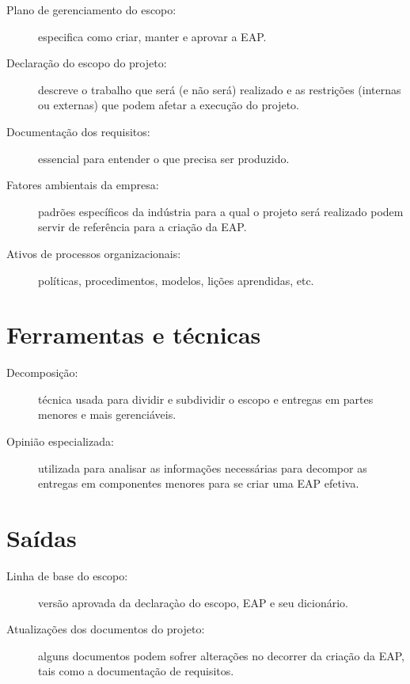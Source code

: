\begin{description}
	
	\item[Plano de gerenciamento do escopo:] especifica como criar, manter e aprovar a EAP.
	
	\item[Declaração do escopo do projeto:] descreve o trabalho que será (e não será) realizado e as restrições (internas ou externas) que podem afetar a execução do projeto.
	
	\item[Documentação dos requisitos:] essencial para entender o que precisa ser produzido.
	
	\item[Fatores ambientais da empresa:] padrões específicos da indústria para a qual o projeto será realizado podem servir de referência para a criação da EAP. 
	
	\item[Ativos de processos organizacionais:] políticas, procedimentos, modelos, lições aprendidas, etc.
	
\end{description}

\section{Ferramentas e técnicas}

\begin{description}
	
	\item[Decomposição:] técnica usada para dividir e subdividir o escopo e entregas em partes menores e mais gerenciáveis.
	
	\item[Opinião especializada:] utilizada para analisar as informações necessárias para decompor as entregas em componentes menores para se criar uma EAP efetiva.
	
\end{description}

\section{Saídas}

\begin{description}
	
	\item[Linha de base do escopo:] versão aprovada da declaraçào do escopo, EAP e seu dicionário.
	
	\item[Atualizações dos documentos do projeto:] alguns documentos podem sofrer alterações no decorrer da criação da EAP, tais como a documentação de requisitos.
	
\end{description}

